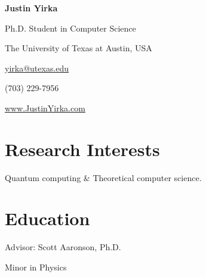 \documentclass[11pt,letterpaper,serif]{moderncv}
\begin{document}
	
	
\thispagestyle{firstpage}

\begin{center}
	{\huge\textbf{Justin Yirka}}
	
	Ph.D. Student in Computer Science
	
	The University of Texas at Austin, USA
	
	\vspace{\baselineskip}
	
	\href{mailto:yirka@utexas.edu}{yirka@utexas.edu}
	
	(703) 229-7956
	
	\url{www.JustinYirka.com}	
\end{center}


\setlength{\parskip}{0.4em}

\section{Research Interests}
Quantum computing \& Theoretical computer science.


\section{Education}
{
	\normalsize
	\begin{adjustwidth}{.25in}{}
		 Advisor: Scott Aaronson, Ph.D.
	\end{adjustwidth}
}

\vspace{-\baselineskip}\vspace{-2\parskip}
{%
}
{
	\begin{adjustwidth}{.25in}{}
		Minor in Physics %
	\end{adjustwidth}
}
\end{document}
